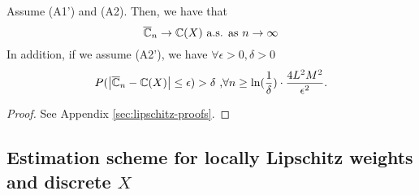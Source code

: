 \begin{proposition}
\label{prop:lipschitz}
Assume (A1') and (A2). Then, we have that 
$$\overline {\mathbb{C}}_n
\rightarrow
\mathbb{C}(X)
 \text{   a.s. as } n\rightarrow \infty
$$
In addition, if we assume (A2'), we have $\forall \epsilon >0, \delta >0$ 
$$
P(\left |\overline {\mathbb{C}}_n- \mathbb{C}(X) \right| \leq  \epsilon ) > \delta\text{     ,} \forall n \geq \ln(\frac{1}{\delta})\cdot 
\frac{4L^2 M^2}{\epsilon^{2}}.
$$
\end{proposition}
\begin{proof}
See Appendix \ref{sec:lipschitz-proofs}.
\end{proof}

\subsection{Estimation scheme for locally Lipschitz weights and discrete $X$}

